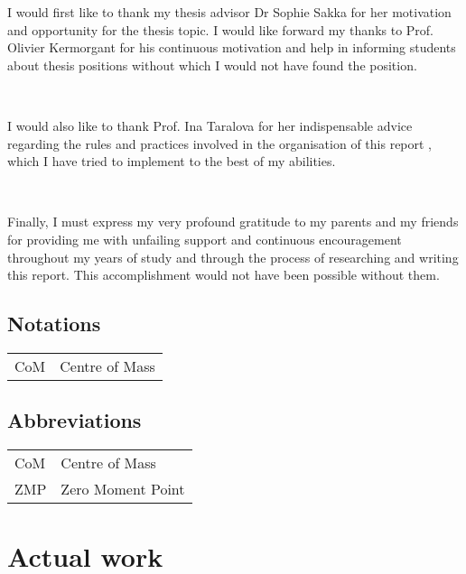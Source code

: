 \documentclass{thesisreport}
\begin{document}
 I would first like to thank my thesis advisor Dr Sophie Sakka for her motivation and opportunity for the thesis topic.
  I would like forward my thanks to Prof. Olivier Kermorgant for his continuous motivation and help in informing 
  students about thesis positions without which I would not have found the position. 

~

I would also like to thank Prof. Ina Taralova for her indispensable advice regarding the rules and practices involved 
in the organisation of this report , which I have tried to implement to the best of my abilities.

~

Finally, I must express my very profound gratitude to my parents and my friends for providing me with unfailing 
support and continuous encouragement throughout my years of study and through the process of researching and writing 
this report. This accomplishment would not have been possible without them.
 \newpage
 
 
\section*{Notations}
    \begin{tabular}{p{3cm}p{10cm}}
    CoM & Centre of Mass
    \end{tabular}

\newpage

\section*{Abbreviations}

\begin{tabular}{p{3cm}p{10cm}}
CoM & Centre of Mass \\
ZMP & Zero Moment Point \\

\end{tabular}

 \newpage
 
 \tableofcontents

 \listoffigures
 
\listoftables
 

 
 
 


 
 \chapter{Actual work}
  
\end{document}
